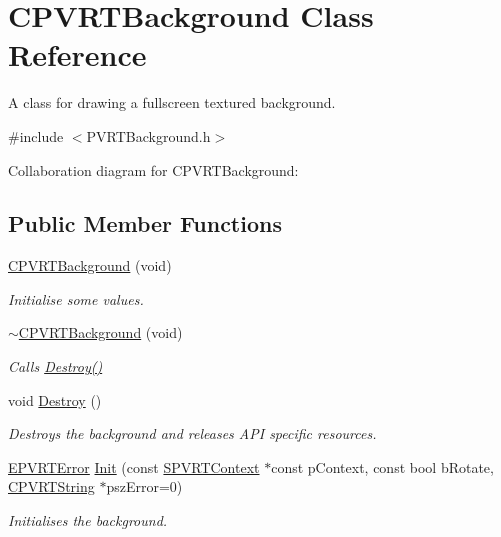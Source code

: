\hypertarget{class_c_p_v_r_t_background}{\section{C\+P\+V\+R\+T\+Background Class Reference}
\label{class_c_p_v_r_t_background}
}


A class for drawing a fullscreen textured background.  




{\ttfamily \#include $<$P\+V\+R\+T\+Background.\+h$>$}



Collaboration diagram for C\+P\+V\+R\+T\+Background\+:
\subsection*{Public Member Functions}
\begin{DoxyCompactItemize}
\item 
\hyperlink{class_c_p_v_r_t_background_ac91b7a93aa7e3a3841827e86647ddeab}{C\+P\+V\+R\+T\+Background} (void)
\begin{DoxyCompactList}\small\item\em Initialise some values. \end{DoxyCompactList}\item 
\hyperlink{class_c_p_v_r_t_background_a20bdcbc3f5fafa6de94aaf983cded3a0}{$\sim$\+C\+P\+V\+R\+T\+Background} (void)
\begin{DoxyCompactList}\small\item\em Calls \hyperlink{class_c_p_v_r_t_background_afaf4b3af646b48eedcd3e9479c47bb87}{Destroy()} \end{DoxyCompactList}\item 
void \hyperlink{class_c_p_v_r_t_background_afaf4b3af646b48eedcd3e9479c47bb87}{Destroy} ()
\begin{DoxyCompactList}\small\item\em Destroys the background and releases A\+P\+I specific resources. \end{DoxyCompactList}\item 
\hyperlink{_p_v_r_t_error_8h_a9e837ff1a83f3a5f332bc4cc78454608}{E\+P\+V\+R\+T\+Error} \hyperlink{class_c_p_v_r_t_background_a340207512e49ad2a91bff7c931334ea6}{Init} (const \hyperlink{struct_s_p_v_r_t_context}{S\+P\+V\+R\+T\+Context} $\ast$const p\+Context, const bool b\+Rotate, \hyperlink{class_c_p_v_r_t_string}{C\+P\+V\+R\+T\+String} $\ast$psz\+Error=0)
\begin{DoxyCompactList}\small\item\em Initialises the background. \end{DoxyCompactList}\end{DoxyCompactItemize}
